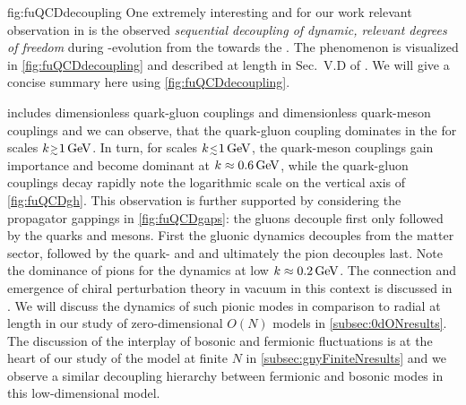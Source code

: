 	{fig:fuQCDdecoupling}
One extremely interesting and for our work relevant observation in  is the observed \textit{sequential decoupling of dynamic, relevant degrees of freedom} during \rgscale-evolution from the \uv{} towards the \ir{}.
The phenomenon is visualized in \cref{fig:fuQCDdecoupling} and described at length in Sec.~V.D of .
We will give a concise summary here using \cref{fig:fuQCDdecoupling}.

 includes dimensionless quark-gluon couplings and dimensionless quark-meson couplings and we can observe, that the quark-gluon coupling dominates in the \uv{} for scales 
$k\smallergtrsim 1\,\GeV$.
In turn, for scales $k\smallerlesssim 1\,\GeV$, the quark-meson couplings gain importance and become dominant at $k\approx 0.6\,\mathrm{GeV}$, while the quark-gluon couplings decay rapidly \dash{} note the logarithmic scale on the vertical axis of \cref{fig:fuQCDgh}.
This observation is further supported by considering the propagator gappings in \cref{fig:fuQCDgaps}: the gluons decouple first only followed by the quarks and mesons.
First the gluonic dynamics decouples from the matter sector, followed by the quark- and \sigmaModes{} and ultimately the pion decouples last.
Note the dominance of pions for the dynamics at low \rgscales{} $k\approx 0.2\,\mathrm{GeV}$.
The connection and emergence of chiral perturbation theory in vacuum in this context is discussed in .
We will discuss the dynamics of such pionic modes in comparison to radial \sigmaModes{} at length in our study of zero-dimensional $O(N)$ models in \cref{subsec:0dONresults}.
The discussion of the interplay of bosonic and fermionic fluctuations is at the heart of our study of the \gn{} model at finite $N$ in \cref{subsec:gnyFiniteNresults} and we observe a similar decoupling hierarchy between fermionic and bosonic modes in this low-dimensional model.

